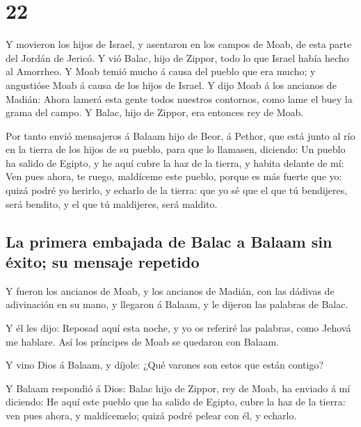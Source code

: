 \hypertarget{section-21}{%
\section{22}\label{section-21}}

 Y movieron los hijos de Israel, y asentaron en los campos
de Moab, de esta parte del Jordán de Jericó.  Y vió Balac,
hijo de Zippor, todo lo que Israel había hecho al Amorrheo.
 Y Moab temió mucho á causa del pueblo que era mucho; y
angustióse Moab á causa de los hijos de Israel.  Y dijo
Moab á los ancianos de Madián: Ahora lamerá esta gente todos nuestros
contornos, como lame el buey la grama del campo. Y Balac, hijo de
Zippor, era entonces rey de Moab.

 Por tanto envió mensajeros á Balaam hijo de Beor, á
Pethor, que está junto al río en la tierra de los hijos de su pueblo,
para que lo llamasen, diciendo: Un pueblo ha salido de Egipto, y he aquí
cubre la haz de la tierra, y habita delante de mí:  Ven
pues ahora, te ruego, maldíceme este pueblo, porque es más fuerte que
yo: quizá podré yo herirlo, y echarlo de la tierra: que yo sé que el que
tú bendijeres, será bendito, y el que tú maldijeres, será maldito.

\hypertarget{la-primera-embajada-de-balac-a-balaam-sin-uxe9xito-su-mensaje-repetido}{%
\subsection{La primera embajada de Balac a Balaam sin éxito; su mensaje
repetido}\label{la-primera-embajada-de-balac-a-balaam-sin-uxe9xito-su-mensaje-repetido}}

 Y fueron los ancianos de Moab, y los ancianos de Madián,
con las dádivas de adivinación en su mano, y llegaron á Balaam, y le
dijeron las palabras de Balac.

 Y él les dijo: Reposad aquí esta noche, y yo os referiré
las palabras, como Jehová me hablare. Así los príncipes de Moab se
quedaron con Balaam.

 Y vino Dios á Balaam, y díjole: ¿Qué varones son estos
que están contigo?

 Y Balaam respondió á Dios: Balac hijo de Zippor, rey de
Moab, ha enviado á mí diciendo:  He aquí este pueblo que
ha salido de Egipto, cubre la haz de la tierra: ven pues ahora, y
maldícemelo; quizá podré pelear con él, y echarlo.

